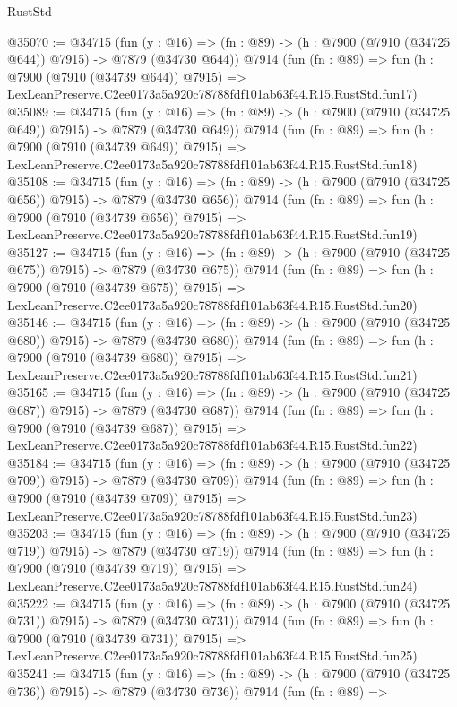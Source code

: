 \begin{lexlean}{RustStd}
\begin{coremodule}
@35070 := @34715
    (fun (y : @16) => (fn : @89) -> (h : @7900 (@7910 (@34725 @644)) @7915) -> @7879 (@34730 @644))
    @7914
    (fun (fn : @89) =>
    fun (h : @7900 (@7910 (@34739 @644)) @7915) =>
    LexLeanPreserve.C2ee0173a5a920c78788fdf101ab63f44.R15.RustStd.fun17)
@35089 := @34715
    (fun (y : @16) => (fn : @89) -> (h : @7900 (@7910 (@34725 @649)) @7915) -> @7879 (@34730 @649))
    @7914
    (fun (fn : @89) =>
    fun (h : @7900 (@7910 (@34739 @649)) @7915) =>
    LexLeanPreserve.C2ee0173a5a920c78788fdf101ab63f44.R15.RustStd.fun18)
@35108 := @34715
    (fun (y : @16) => (fn : @89) -> (h : @7900 (@7910 (@34725 @656)) @7915) -> @7879 (@34730 @656))
    @7914
    (fun (fn : @89) =>
    fun (h : @7900 (@7910 (@34739 @656)) @7915) =>
    LexLeanPreserve.C2ee0173a5a920c78788fdf101ab63f44.R15.RustStd.fun19)
@35127 := @34715
    (fun (y : @16) => (fn : @89) -> (h : @7900 (@7910 (@34725 @675)) @7915) -> @7879 (@34730 @675))
    @7914
    (fun (fn : @89) =>
    fun (h : @7900 (@7910 (@34739 @675)) @7915) =>
    LexLeanPreserve.C2ee0173a5a920c78788fdf101ab63f44.R15.RustStd.fun20)
@35146 := @34715
    (fun (y : @16) => (fn : @89) -> (h : @7900 (@7910 (@34725 @680)) @7915) -> @7879 (@34730 @680))
    @7914
    (fun (fn : @89) =>
    fun (h : @7900 (@7910 (@34739 @680)) @7915) =>
    LexLeanPreserve.C2ee0173a5a920c78788fdf101ab63f44.R15.RustStd.fun21)
@35165 := @34715
    (fun (y : @16) => (fn : @89) -> (h : @7900 (@7910 (@34725 @687)) @7915) -> @7879 (@34730 @687))
    @7914
    (fun (fn : @89) =>
    fun (h : @7900 (@7910 (@34739 @687)) @7915) =>
    LexLeanPreserve.C2ee0173a5a920c78788fdf101ab63f44.R15.RustStd.fun22)
@35184 := @34715
    (fun (y : @16) => (fn : @89) -> (h : @7900 (@7910 (@34725 @709)) @7915) -> @7879 (@34730 @709))
    @7914
    (fun (fn : @89) =>
    fun (h : @7900 (@7910 (@34739 @709)) @7915) =>
    LexLeanPreserve.C2ee0173a5a920c78788fdf101ab63f44.R15.RustStd.fun23)
@35203 := @34715
    (fun (y : @16) => (fn : @89) -> (h : @7900 (@7910 (@34725 @719)) @7915) -> @7879 (@34730 @719))
    @7914
    (fun (fn : @89) =>
    fun (h : @7900 (@7910 (@34739 @719)) @7915) =>
    LexLeanPreserve.C2ee0173a5a920c78788fdf101ab63f44.R15.RustStd.fun24)
@35222 := @34715
    (fun (y : @16) => (fn : @89) -> (h : @7900 (@7910 (@34725 @731)) @7915) -> @7879 (@34730 @731))
    @7914
    (fun (fn : @89) =>
    fun (h : @7900 (@7910 (@34739 @731)) @7915) =>
    LexLeanPreserve.C2ee0173a5a920c78788fdf101ab63f44.R15.RustStd.fun25)
@35241 := @34715
    (fun (y : @16) => (fn : @89) -> (h : @7900 (@7910 (@34725 @736)) @7915) -> @7879 (@34730 @736))
    @7914
    (fun (fn : @89) =>

\end{coremodule}
\end{lexlean}
